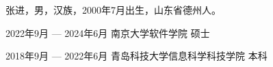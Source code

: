 \documentclass[winfonts,master,twoside]{njuthesis}
\begin{document}
\backmatter
\begin{resume}
\begin{authorinfo}
\noindent 张进，男，汉族，2000年7月出生，山东省德州人。
\end{authorinfo}
\begin{education}
\item[2022年9月 --- 2024年6月] 南京大学软件学院 \hfill 硕士
\item[2018年9月 --- 2022年6月] 青岛科技大学信息科学科技学院 \hfill 本科
\end{education}


\end{resume}


\end{document}
